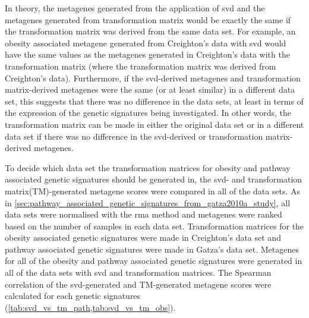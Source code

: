 In theory, the metagenes generated from the application of \gls{svd} and the metagenes generated from transformation matrix would be exactly the same if the transformation matrix was derived from the same data set.
For example, an obesity associated metagene generated from Creighton's data with \gls{svd} would have the same values as the metagenes generated in Creighton's data with the transformation matrix (where the transformation matrix was derived from Creighton's data).
Furthermore, if the \gls{svd}-derived metagenes and transformation matrix-derived metagenes were the same (or at least similar) in a different data set, this suggests that there was no difference in the data sets, at least in terms of the expression of the genetic signatures being investigated.
In other words, the transformation matrix can be made in either the original data set or in a different data set if there was no difference in the \gls{svd}-derived or transformation matrix-derived metagenes.

To decide which data set the transformation matrices for obesity and pathway associated genetic signatures should be generated in, the \gls{svd}- and transformation matrix(TM)-generated metagene scores were compared in all of the data sets.
As in \cref{sec:pathway_associated_genetic_signatures_from_gatza2010a_study}, all data sets were normalised with the \gls{rma} method and metagenes were ranked based on the number of samples in each data set.
Transformation matrices for the obesity associated genetic signatures were made in Creighton's data set and pathway associated genetic signatures were made in Gatza's data set.
Metagenes for all of the obesity and pathway associated genetic signatures were generated in all of the data sets with \gls{svd} and transformation matrices.
The Spearman correlation of the \gls{svd}-generated and TM-generated metagene scores were calculated for each genetic signatures (\cref{tab:svd_vs_tm_path,tab:svd_vs_tm_obs}).

